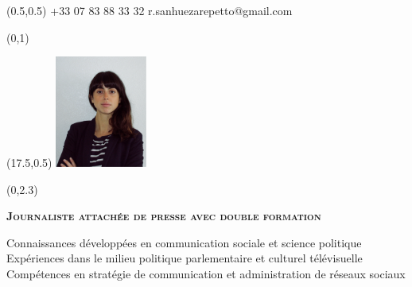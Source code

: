 \documentclass[30pt, french]{tccv}
\begin{document}
\begin{upshape}
\fontsize{9pt}{1em}\color{text}\selectfont





\begin{textblock}{6.5}(0.5,0.5)
    {+33 07 83 88 33 32}
    {r.sanhuezarepetto@gmail.com}
\end{textblock}

\begin{textblock}{21}(0,1)
\end{textblock}

\begin{textblock}{21}(17.5,0.5)
		\includegraphics[width=3cm]{../Figure/Rocio3.png}
\end{textblock}  



\begin{textblock}{21}(0,2.3)

\begin{center}
\fontsize{10pt}{1.5em}\color{text}\bodyfontlight\upshape\selectfont

	{\fontsize{14pt}{5em}\scshape\bfseries Journaliste attachée de presse avec double formation \\} 

	\vspace{5pt}
Connaissances développées en communication sociale et science politique 			 \\
Expériences dans le milieu politique parlementaire et culturel télévisuelle 		 \\
Compétences en stratégie de communication et administration de réseaux sociaux 		\\

\end{center}
\end{textblock}  







\end{upshape}
\end{document}
